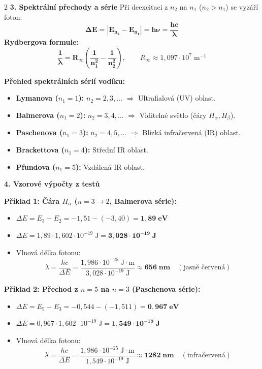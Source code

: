 \documentclass[9pt,a4paper]{article}
\begin{document}
\begin{tcolorbox}[secbox,title=4. BOHRŮV MODEL ATOMU VODÍKU A SPEKTRÁLNÍ PŘECHODY]
\begin{multicols}{2}
\textbf{\large 3. Spektrální přechody a série}
Při deexcitaci z $n_2$ na $n_1$ ($n_2 > n_1$) se vyzáří foton:
\[\mathbf{\Delta E = |E_{n_2} - E_{n_1}| = h\nu = \frac{hc}{\lambda}}\]
\textbf{Rydbergova formule:}
\[\mathbf{\frac{1}{\lambda} = R_\infty \left(\frac{1}{n_1^2} - \frac{1}{n_2^2}\right)}, \qquad R_\infty \approx 1{,}097 \cdot 10^7\;\text{m}^{-1}\]

\textbf{Přehled spektrálních sérií vodíku:}
\begin{itemize}
  \item \textbf{Lymanova ($n_1 = 1$):} $n_2 = 2, 3, \dots$ $\Rightarrow$ Ultrafialová (UV) oblast.
  \item \textbf{Balmerova ($n_1 = 2$):} $n_2 = 3, 4, \dots$ $\Rightarrow$ Viditelné světlo (čáry $H_\alpha, H_\beta$).
  \item \textbf{Paschenova ($n_1 = 3$):} $n_2 = 4, 5, \dots$ $\Rightarrow$ Blízká infračervená (IR) oblast.
  \item \textbf{Brackettova ($n_1 = 4$):} Střední IR oblast.
  \item \textbf{Pfundova ($n_1 = 5$):} Vzdálená IR oblast.
\end{itemize}

\vspace{1mm}
\textbf{\large 4. Vzorové výpočty z testů}

\textbf{Příklad 1: Čára $H_\alpha$ ($n = 3 \to 2$, Balmerova série):}
\begin{itemize}
  \item $\Delta E = E_3 - E_2 = -1{,}51 - (-3{,}40) = \mathbf{1{,}89\;\text{eV}}$
  \item $\Delta E = 1{,}89 \cdot 1{,}602 \cdot 10^{-19}\;\text{J} = \mathbf{3{,}028 \cdot 10^{-19}\;\text{J}}$
  \item Vlnová délka fotonu:
  \[\lambda = \frac{hc}{\Delta E} = \frac{1{,}986 \cdot 10^{-25}\;\text{J}\cdot\text{m}}{3{,}028 \cdot 10^{-19}\;\text{J}} \approx \mathbf{656\;\text{nm}} \quad (\text{jasně červená})\]
\end{itemize}

\textbf{Příklad 2: Přechod z $n = 5$ na $n = 3$ (Paschenova série):}
\begin{itemize}
  \item $\Delta E = E_5 - E_3 = -0{,}544 - (-1{,}511) = \mathbf{0{,}967\;\text{eV}}$
  \item $\Delta E = 0{,}967 \cdot 1{,}602 \cdot 10^{-19}\;\text{J} = \mathbf{1{,}549 \cdot 10^{-19}\;\text{J}}$
  \item Vlnová délka fotonu:
  \[\lambda = \frac{hc}{\Delta E} = \frac{1{,}986 \cdot 10^{-25}\;\text{J}\cdot\text{m}}{1{,}549 \cdot 10^{-19}\;\text{J}} \approx \mathbf{1282\;\text{nm}} \quad (\text{infračervená})\]
\end{itemize}

\end{multicols}
\end{tcolorbox}
\end{document}
